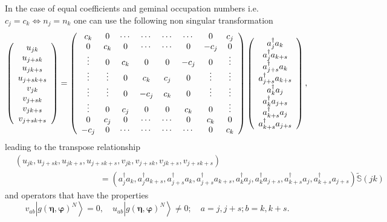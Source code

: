 \documentclass[aps,preprint]{revtex4}%
\begin{document}
In the case of equal coefficients and geminal occupation numbers i.e.
$c_{j}=c_{k}\Leftrightarrow n_{j}=n_{k}$ one can use the following non
singular transformation
\begin{equation}
\left(
\begin{array}
[c]{c}%
u_{jk}\\
u_{j+sk}\\
u_{jk+s}\\
u_{j+sk+s}\\
v_{jk}\\
v_{j+sk}\\
v_{jk+s}\\
v_{j+sk+s}%
\end{array}
\right)  =\left(
\begin{array}
[c]{cccccccc}%
c_{k} & 0 & \cdots & \cdots & \cdots & \cdots & 0 & c_{j}\\
0 & c_{k} & 0 & \cdots & \cdots & 0 & -c_{j} & 0\\
\vdots & 0 & c_{k} & 0 & 0 & -c_{j} & 0 & \vdots\\
\vdots & \vdots & 0 & c_{k} & c_{j} & 0 & \vdots & \vdots\\
\vdots & \vdots & 0 & -c_{j} & c_{k} & 0 & \vdots & \vdots\\
\vdots & 0 & c_{j} & 0 & 0 & c_{k} & 0 & \vdots\\
0 & c_{j} & 0 & \cdots & \cdots & 0 & c_{k} & 0\\
-c_{j} & 0 & \cdots & \cdots & \cdots & \cdots & 0 & c_{k}%
\end{array}
\right)  \left(
\begin{array}
[c]{c}%
a_{j}^{\dagger}a_{k}\\
a_{j}^{\dagger}a_{k+s}\\
a_{j+s}^{\dagger}a_{k}\\
a_{j+s}^{\dagger}a_{k+s}\\
a_{k}^{\dagger}a_{j}\\
a_{k}^{\dagger}a_{j+s}\\
a_{k+s}^{\dagger}a_{j}\\
a_{k+s}^{\dagger}a_{j+s}%
\end{array}
\right)  ,
\end{equation}
leading to the transpose relationship
\begin{align}
&  \left(  u_{jk},u_{j+sk},u_{jk+s},u_{j+sk+s},v_{jk},v_{j+sk},v_{jk+s}%
,v_{j+sk+s}\right) \nonumber\\
&  \qquad\qquad\qquad\qquad\qquad\left.  =\right.  \left(  a_{j}^{\dagger
}a_{k},a_{j}^{\dagger}a_{k+s},a_{j+s}^{\dagger}a_{k},a_{j+s}^{\dagger}%
a_{k+s},a_{k}^{\dagger}a_{j},a_{k}^{\dagger}a_{j+s},a_{k+s}^{\dagger}%
a_{j},a_{k+s}^{\dagger}a_{j+s}\right)  \mathbb{\tilde{S}}\left(  jk\right)
\end{align}
and operators that have the properties
\begin{equation}
v_{ab}\left\vert g\left(  \bm{\eta},\bm{\varphi}\right)  ^{N}\right\rangle
=0,\quad u_{ab}\left\vert g\left(  \bm{\eta },\bm{\varphi}\right)
^{N}\right\rangle \neq0;\quad a=j,j+s;b=k,k+s.
\end{equation}
\end{document}
